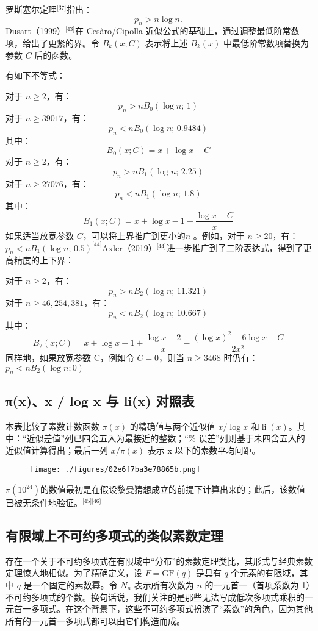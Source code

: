 罗斯塞尔定理\(^\text{[37]}\)指出：
$$
p_n > n \log n.~
$$
Dusart（1999）\(^\text{[43]}\)在 Cesàro/Cipolla 近似公式的基础上，通过调整最低阶常数项，给出了更紧的界。令 $B_k(x; C)$ 表示将上述 $B_k(x)$ 中最低阶常数项替换为参数 $C$ 后的函数。

有如下不等式：

对于 $n \geq 2$，有：
$$
p_n > n B_0(\log n;\, 1)~
$$
对于 $n \geq 39017$，有：
$$
p_n < n B_0(\log n;\, 0.9484)~
$$
其中：
$$
B_0(x; C) = x + \log x - C~
$$
对于 $n \geq 2$，有：
$$
p_n > n B_1(\log n;\, 2.25)~
$$
对于 $n \geq 27076$，有：
$$
p_n < n B_1(\log n;\, 1.8)~
$$
其中：
$$
B_1(x; C) = x + \log x - 1 + \frac{\log x - C}{x}~
$$
如果适当放宽参数 $C$，可以将上界推广到更小的$n$ 。例如，对于 $n \geq 20$，有：$p_n < n B_1(\log n;\, 0.5)^\text{[44]}$Axler（2019）\(^\text{[44]}\)进一步推广到了二阶表达式，得到了更高精度的上下界：

对于 \( n \geq 2 \)，有：
$$
p_n > n B_2(\log n;\, 11.321)~
$$
对于 $n \geq 46,\!254,\!381$，有：
$$
p_n < n B_2(\log n;\, 10.667)~
$$
其中：
$$
B_2(x; C) = x + \log x - 1 + \frac{\log x - 2}{x} - \frac{(\log x)^2 - 6 \log x + C}{2 x^2}~
$$
同样地，如果放宽参数 C，例如令 $C = 0$，则当 $n \geq 3468$ 时仍有：$p_n < n B_2(\log n; 0)$
\subsection{π(x)、x / log x 与 li(x) 对照表}
本表比较了素数计数函数 $\pi(x)$ 的精确值与两个近似值 $x/\log x$ 和$\operatorname{li}(x)$。其中：“近似差值”列已四舍五入为最接近的整数；“\% 误差”列则基于未四舍五入的近似值计算得出；最后一列 $x/\pi(x)$ 表示 x 以下的素数平均间距。
\begin{figure}[ht]
\centering
\texttt{[image: ./figures/02e6f7ba3e78865b.png]}
\caption{} \label{fig_SDL_5}
\end{figure}
$\pi(10^{24})$的数值最初是在假设黎曼猜想成立的前提下计算出来的；此后，该数值已被无条件地验证。\(^\text{[45][46]}\)
\subsection{有限域上不可约多项式的类似素数定理}
存在一个关于不可约多项式在有限域中“分布”的素数定理类比，其形式与经典素数定理惊人地相似。为了精确定义，设 $F = \mathrm{GF}(q)$ 是具有 $q$ 个元素的有限域，其中 $q$ 是一个固定的素数幂。令 $N_n$ 表示所有次数为 $n$ 的一元首一（首项系数为 1）不可约多项式的个数。换句话说，我们关注的是那些无法写成低次多项式乘积的一元首一多项式。在这个背景下，这些不可约多项式扮演了“素数”的角色，因为其他所有的一元首一多项式都可以由它们构造而成。


